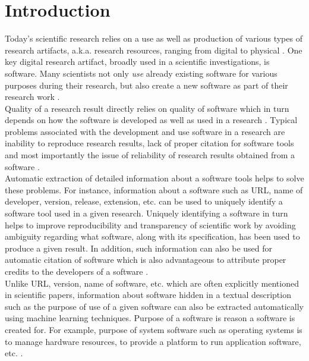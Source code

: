 \chapter{Introduction}
\label{ch:intro}

Today’s scientific research relies on a use as well as production of various types of research artifacts, a.k.a. research resources, ranging from digital to physical \citep{schindler2019annotation}. One key digital research artifact, broadly used in a scientific investigations, is software. Many scientists not only \emph{use} already existing software for various purposes during their research, but also create a new software as part of their research work \citep{goble2014better, hannay2009scientists}. \\


Quality of a research result directly relies on quality of software which in turn depends on  how the software is developed as well as used in a research \citep{hannay2009scientists}. Typical problems associated with the development and use software in a research are inability to reproduce research results, lack of proper citation for software tools and most importantly the issue of reliability of research results obtained from a software \citep{schindler2021somesci, baker2016reproducibility, soergel2014rampant}. \\


Automatic extraction of detailed information about a software tools helps to solve these problems. For instance, information about a software such as \ac{URL}, name of developer, version, release, extension, etc. can be used to uniquely identify a software tool used in a given research. Uniquely identifying a software in turn helps to improve reproducibility and transparency of scientific work by avoiding ambiguity regarding what software, along with its specification,  has been used to produce a given result. In addition, such information can also be used for automatic citation of software which is also advantageous to attribute proper credits to the developers of a software \citep{kruger2019literature}. \\


Unlike \ac{URL}, version, name of software, etc. which are often explicitly mentioned in scientific papers, information about software hidden in a textual description such as the purpose of use of a given software can also be extracted automatically using machine learning techniques. Purpose of a software is reason a software is created for. For example, purpose of system software such as operating systems is to manage hardware resources, to provide a platform to run application software, etc. \citep{enwiki:1076010620}. \\


